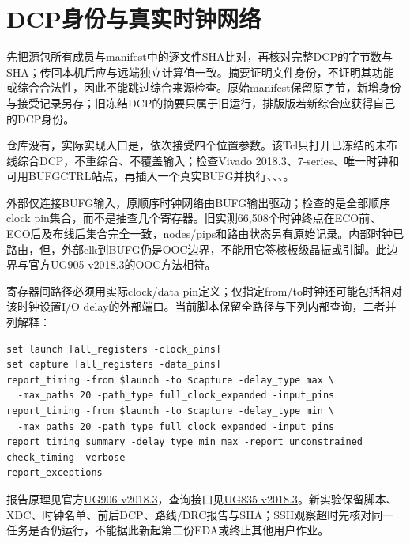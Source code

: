 \section{DCP身份与真实时钟网络}
先把源包所有成员与manifest中的逐文件SHA比对，再核对完整DCP的字节数与SHA；传回本机后应与远端独立计算值一致。摘要证明文件身份，不证明其功能或综合合法性，因此不能跳过综合来源检查。原始manifest保留原字节，新增身份与接受记录另存；旧冻结DCP的摘要只属于旧运行，排版版若新综合应获得自己的DCP身份。

仓库没有，实际实现入口是，依次接受四个位置参数。该Tcl只打开已冻结的未布线综合DCP，不重综合、不覆盖输入；检查Vivado 2018.3、7-series、唯一时钟和可用BUFGCTRL站点，再插入一个真实BUFG并执行、、、。

外部仅连接BUFG输入，原顺序时钟网络由BUFG输出驱动；检查的是全部顺序clock pin集合，而不是抽查几个寄存器。旧实测66,508个时钟终点在ECO前、ECO后及布线后集合完全一致，nodes/pips和路由状态另有原始记录。内部时钟已路由，但，外部clk到BUFG仍是OOC边界，不能用它签核板级晶振或引脚。此边界与官方\href{https://docs.amd.com/v/u/2018.3-English/ug905-vivado-hierarchical-design}{UG905 v2018.3的OOC方法}相符。

寄存器间路径必须用实际clock/data pin定义；仅指定from/to时钟还可能包括相对该时钟设置I/O delay的外部端口。当前脚本保留全路径与下列内部查询，二者并列解释：
\begingroup\footnotesize
\begin{verbatim}
set launch [all_registers -clock_pins]
set capture [all_registers -data_pins]
report_timing -from $launch -to $capture -delay_type max \
  -max_paths 20 -path_type full_clock_expanded -input_pins
report_timing -from $launch -to $capture -delay_type min \
  -max_paths 20 -path_type full_clock_expanded -input_pins
report_timing_summary -delay_type min_max -report_unconstrained
check_timing -verbose
report_exceptions
\end{verbatim}
\endgroup
报告原理见官方\href{https://docs.amd.com/v/u/2018.3-English/ug906-vivado-design-analysis}{UG906 v2018.3}，查询接口见\href{https://docs.amd.com/v/u/2018.3-English/ug835-vivado-tcl-commands}{UG835 v2018.3}。新实验保留脚本、XDC、时钟名单、前后DCP、路线/DRC报告与SHA；SSH观察超时先核对同一任务是否仍运行，不能据此新起第二份EDA或终止其他用户作业。

